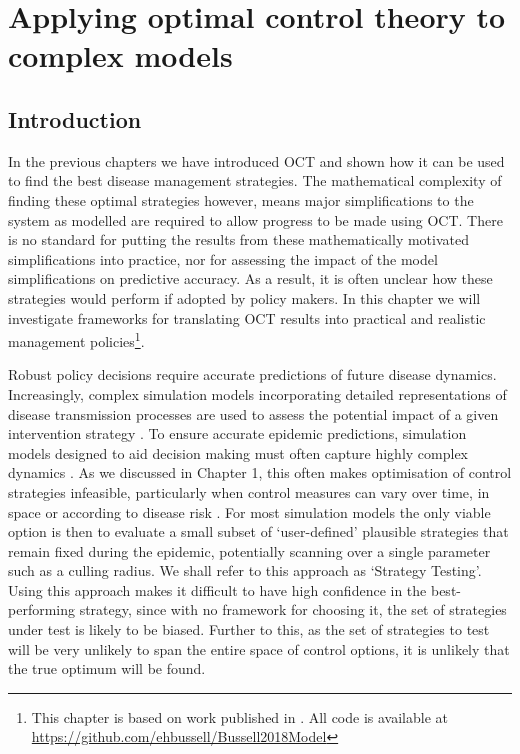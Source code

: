 %
\chapter{Applying optimal control theory to complex models\label{ch:complex_models}}

\section{Introduction\label{sec:ch4:Intro}}

In the previous chapters we have introduced OCT and shown how it can be used to find the best disease management strategies. The mathematical complexity of finding these optimal strategies however, means major simplifications to the system as modelled are required to allow progress to be made using OCT\@. There is no standard for putting the results from these mathematically motivated simplifications into practice, nor for assessing the impact of the model simplifications on predictive accuracy. As a result, it is often unclear how these strategies would perform if adopted by policy makers. In this chapter we will investigate frameworks for translating OCT results into practical and realistic management policies\footnote{This chapter is based on work published in \citet{bussell_applying_2019}. All code is available at \url{https://github.com/ehbussell/Bussell2018Model}}.

Robust policy decisions require accurate predictions of future disease dynamics. Increasingly, complex simulation models incorporating detailed representations of disease transmission processes are used to assess the potential impact of a given intervention strategy \citep{lofgren_opinion_2014}. To ensure accurate epidemic predictions, simulation models designed to aid decision making must often capture highly complex dynamics \citep[Chapter 1,][]{savary_simulation_2014}. As we discussed in Chapter 1, this often makes optimisation of control strategies infeasible, particularly when control measures can vary over time, in space or according to disease risk \citep{bellman_dynamic_1957}. For most simulation models the only viable option is then to evaluate a small subset of `user-defined' plausible strategies that remain fixed during the epidemic, potentially scanning over a single parameter such as a culling radius. We shall refer to this approach as `Strategy Testing'. Using this approach makes it difficult to have high confidence in the best-performing strategy, since with no framework for choosing it, the set of strategies under test is likely to be biased. Further to this, as the set of strategies to test will be very unlikely to span the entire space of control options, it is unlikely that the true optimum will be found.

